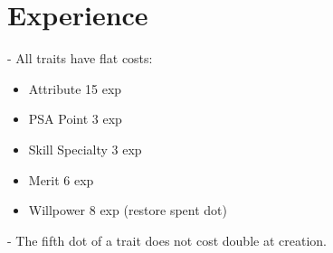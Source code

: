 \documentclass{article}
\begin{document}
\section{Experience}
- All traits have flat costs:
\begin{itemize}
	\item Attribute 15 exp
	\item PSA Point 3 exp
	\item Skill Specialty 3 exp
	\item Merit 6 exp
	\item Willpower 8 exp (restore spent dot)
\end{itemize}
- The fifth dot of a trait does not cost double at creation.

\pagebreak
\tableofcontents
\end{document}
